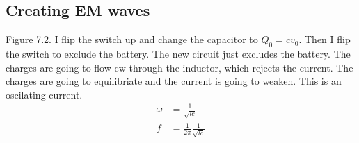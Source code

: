     \subsection{Creating EM waves}
    Figure 7.2. I flip the switch up and change the capacitor to $Q_0=cv_0$. Then I flip the switch to exclude the battery. The new circuit just excludes the battery. The charges are going to flow cw through the inductor, which rejects the current. The charges are going to equilibriate and the current is going to weaken. This is an oscilating current.
    \begin{align*}
        \omega&=\frac{1}{\sqrt{lc}}\\
        f&=\frac{1}{2\pi}\frac{1}{\sqrt{lc}}\\
    \end{align*}

    
